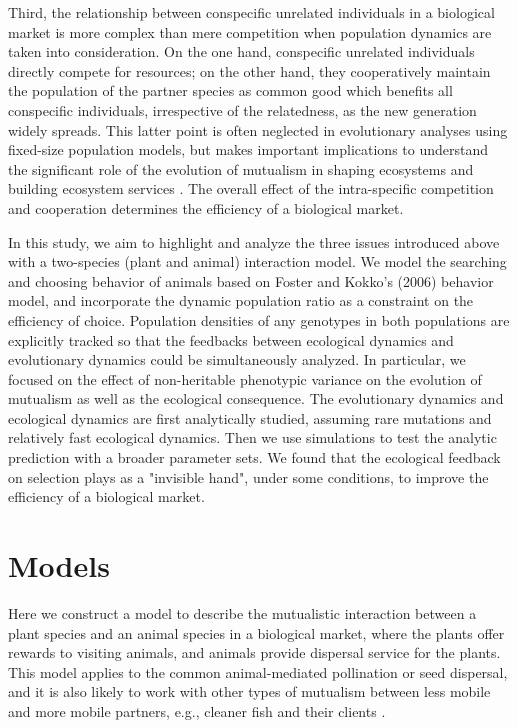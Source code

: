 \documentclass[12pt]{article}
\begin{document}
Third, the relationship between conspecific unrelated individuals in a biological market is more complex than mere competition when population dynamics are taken into consideration. On the one hand, conspecific unrelated individuals directly compete for resources; on the other hand, they cooperatively maintain the population of the partner species as common good which benefits all conspecific individuals, irrespective of the relatedness, as the new generation widely spreads. This latter point is often neglected in evolutionary analyses using fixed-size population models, but makes important implications to understand the significant role of the evolution of mutualism in shaping ecosystems and building ecosystem services \citep{LeighJr2010}. The overall effect of the intra-specific competition and cooperation determines the efficiency of a biological market.

In this study, we aim to highlight and analyze the three issues introduced above with a two-species (plant and animal) interaction model. We model the searching and choosing behavior of animals based on Foster and Kokko's (2006) behavior model, and incorporate the dynamic population ratio as a constraint on the efficiency of choice. Population densities of any genotypes in both populations are explicitly tracked so that the feedbacks between ecological dynamics and evolutionary dynamics could be simultaneously analyzed. In particular, we focused on the effect of non-heritable phenotypic variance on the evolution of mutualism as well as the ecological consequence. The evolutionary dynamics and ecological dynamics are first analytically studied, assuming rare mutations and relatively fast ecological dynamics. Then we use simulations to test the analytic prediction with a broader parameter sets. We found that the ecological feedback on selection plays as a "invisible hand", under some conditions, to improve the efficiency of a biological market.


\section*{Models}

Here we construct a model to describe the mutualistic interaction between a plant species and an animal species in a biological market, where the plants offer rewards to visiting animals, and animals provide dispersal service for the plants. This model applies to the common animal-mediated pollination or seed dispersal, and it is also likely to work with other types of mutualism between less mobile and more mobile partners, e.g., cleaner fish and their clients \citep{Bshary.Grutter2006}. 
\end{document}

